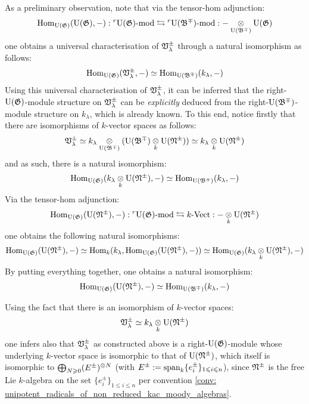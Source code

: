 \begin{remark}
                As a preliminary observation, note that via the tensor-hom adjunction:
                    $$\Hom_{\rmU(\frakG)}(\rmU(\frakG), -): {}^r\rmU(\frakG)\mod \leftrightarrows {}^r\rmU(\frakB^{\mp})\mod : - \tensor_{\rmU(\frakB^{\mp})} \rmU(\frakG)$$
                one obtains a universal characterisation of $\mathfrak{V}_{\lambda}^{\pm}$ through a natural isomorphism as follows:
                    $$\mathrm{Hom}_{\mathrm{U}(\mathfrak{G})}(\mathfrak{V}_{\lambda}^{\pm}, -) \simeq \mathrm{Hom}_{\mathrm{U}(\mathfrak{B}^{\mp})}(k_{\lambda}, -)$$
                Using this universal characterisation of $\mathfrak{V}_{\lambda}^{\pm}$, it can be inferred that the right-$\mathrm{U}(\mathfrak{G})$-module structure on $\mathfrak{V}_{\lambda}^{\pm}$ can be \textit{explicitly} deduced from the right-$\mathrm{U}(\mathfrak{B}^{\mp})$-module structure on $k_{\lambda}$, which is already known. To this end, notice firstly that there are isomorphisms of $k$-vector spaces as follows:
                    $$\frakV_{\lambda}^{\pm} \cong k_{\lambda} \tensor_{\rmU(\frakB^{\mp})} ( \rmU(\frakB^{\mp}) \tensor_k \rmU(\frakN^{\pm}) ) \cong k_{\lambda} \tensor_k \rmU(\frakN^{\pm})$$
                and as such, there is a natural isomorphism:
                    $$\Hom_{\rmU(\frakG)}(k_{\lambda} \tensor_k \rmU(\frakN^{\pm}), -) \cong \Hom_{\rmU(\frakB^{\mp})}(k_{\lambda}, -)$$
                Via the tensor-hom adjunction:
                    $$\Hom_{\rmU(\frakG)}(\rmU(\frakN^{\pm}), -): {}^r\rmU(\frakG)\mod \leftrightarrows k\-\Vect : - \tensor_k\rmU(\frakN^{\pm})$$
                one obtains the following natural isomorphisms:
                    $$\Hom_{\rmU(\frakG)}(\rmU(\frakN^{\pm}), -) \cong \Hom_k(k_{\lambda}, \Hom_{\rmU(\frakG)}(\rmU(\frakN^{\pm}), -)) \cong \Hom_{\rmU(\frakG)}(k_{\lambda} \tensor_k \rmU(\frakN^{\pm}), -)$$
                By putting everything together, one obtains a natural isomorphism:
                    $$\mathrm{Hom}_{\mathrm{U}(\mathfrak{G})}(\mathrm{U}(\mathfrak{N}^{\pm}), -) \simeq \mathrm{Hom}_{\mathrm{U}(\mathfrak{B}^{\mp})}(k_{\lambda}, -)$$
                
                Using the fact that there is an isomorphism of $k$-vector spaces:
                    $$\frakV_{\lambda}^{\pm} \cong k_{\lambda} \tensor_k \rmU(\frakN^{\pm})$$
                one infers also that $\mathfrak{V}_{\lambda}^{\pm}$ as constructed above is a right-$\mathrm{U}(\mathfrak{G})$-module whose underlying $k$-vector space is isomorphic to that of $\mathrm{U}(\mathfrak{N}^{\pm})$, which itself is isomorphic to $\bigoplus_{N \geq 0} (E^{\pm})^{\tensor N}$ (with $E^{\pm} := \operatorname{span}_k \{e_i^{\pm}\}_{1 \leqslant i \leqslant n}$), since $\mathfrak{N}^{\pm}$ is the free Lie $k$-algebra on the set $\{e_i^{\pm}\}_{1 \leq i \leq n}$ per convention \ref{conv: unipotent_radicals_of_non_reduced_kac_moody_algebras}. 
                

\end{remark}

